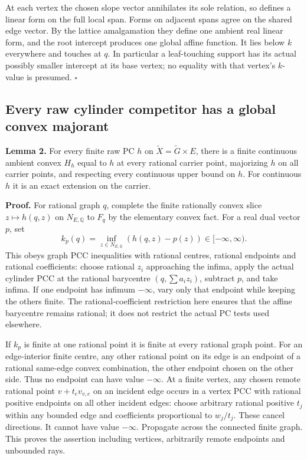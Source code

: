 \documentclass[
  11pt,
]{article}
\begin{document}
At each vertex the chosen slope vector annihilates its sole relation, so
defines a linear form on the full local span. Forms on adjacent spans
agree on the shared edge vector. By the lattice amalgamation they define
one ambient real linear form, and the root intercept produces one global
affine function. It lies below \(k\) everywhere and touches at \(q\). In
particular a leaf-touching support has its actual possibly smaller
intercept at its base vertex; no equality with that vertex's \(k\)-value
is presumed. \(\square\)

\subsection{Every raw cylinder competitor has a global convex
majorant}\label{every-raw-cylinder-competitor-has-a-global-convex-majorant}

\textbf{Lemma 2.} For every finite raw PC \(h\) on
\(\widetilde X=\widetilde G\times E\), there is a finite continuous
ambient convex \(H_h\) equal to \(h\) at every rational carrier point,
majorizing \(h\) on all carrier points, and respecting every continuous
upper bound on \(h\). For continuous \(h\) it is an exact extension on
the carrier.

\textbf{Proof.} For rational graph \(q\), complete the finite rationally
convex slice \(z\mapsto h(q,z)\) on \(N_{E,\mathbb Q}\) to \(F_q\) by
the elementary convex fact. For a real dual vector \(p\), set
\[ k_p(q)=\inf_{z\in N_{E,\mathbb Q}}(h(q,z)-p(z))\in[-\infty,\infty). \tag{11} \]
This obeys graph PCC inequalities with rational centres, rational
endpoints and rational coefficients: choose rational \(z_i\) approaching
the infima, apply the actual cylinder PCC at the rational barycentre
\((q,\sum a_iz_i)\), subtract \(p\), and take infima. If one endpoint
has infimum \(-\infty\), vary only that endpoint while keeping the
others finite. The rational-coefficient restriction here ensures that
the affine barycentre remains rational; it does not restrict the actual
PC tests used elsewhere.

If \(k_p\) is finite at one rational point it is finite at every
rational graph point. For an edge-interior finite centre, any other
rational point on its edge is an endpoint of a rational same-edge convex
combination, the other endpoint chosen on the other side. Thus no
endpoint can have value \(-\infty\). At a finite vertex, any chosen
remote rational point \(v+t_e v_{v,e}\) on an incident edge occurs in a
vertex PCC with rational positive endpoints on all other incident edges:
choose arbitrary rational positive \(t_j\) within any bounded edge and
coefficients proportional to \(w_j/t_j\). These cancel directions. It
cannot have value \(-\infty\). Propagate across the connected finite
graph. This proves the assertion including vertices, arbitrarily remote
endpoints and unbounded rays.
\end{document}
